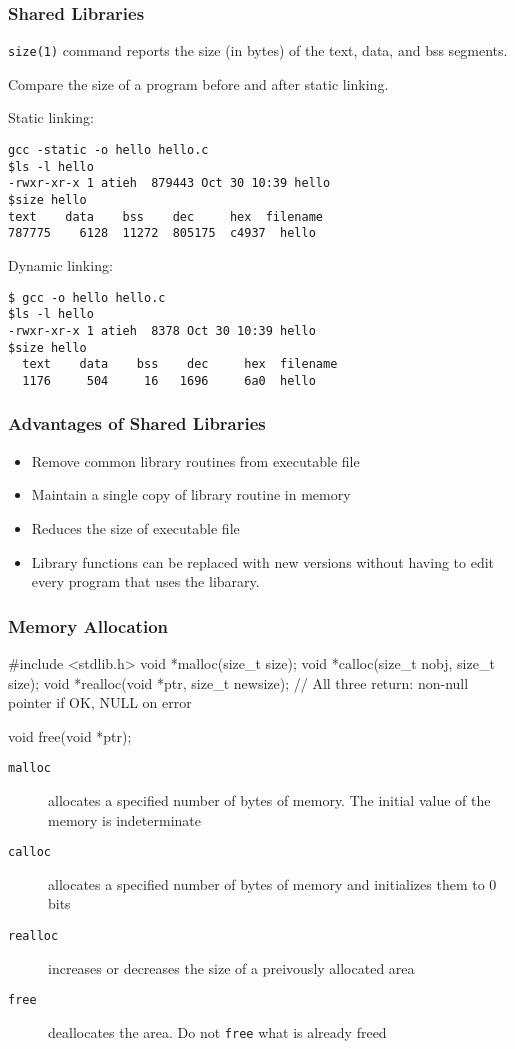 \documentclass[newPxFont,sthlmFooter,nooffset]{beamer}
\begin{document}
\begin{frame}[containsverbatim,t]
  \frametitle{Shared Libraries}
\texttt{size(1)} command reports the size (in bytes) of the text, data, and bss segments.

Compare the size of a program before and after static linking.
\bigskip
{\footnotesize

    Static linking:
\begin{verbatim}
gcc -static -o hello hello.c
$ls -l hello
-rwxr-xr-x 1 atieh  879443 Oct 30 10:39 hello
$size hello
text    data    bss    dec     hex  filename
787775    6128  11272  805175  c4937  hello
\end{verbatim}
    Dynamic linking:
\begin{verbatim}
$ gcc -o hello hello.c
$ls -l hello
-rwxr-xr-x 1 atieh  8378 Oct 30 10:39 hello
$size hello
  text    data    bss    dec     hex  filename
  1176     504     16   1696     6a0  hello
\end{verbatim}

}
\end{frame}

\begin{frame}[containsverbatim,t]
  \frametitle{Advantages of Shared Libraries}
\begin{itemize}
\item Remove common library routines from executable file
\item Maintain a single copy of library routine in memory
\item Reduces the size of executable file
\item Library functions can be replaced with new versions without having to edit every program that uses the libarary.
\end{itemize}
\end{frame}

\begin{frame}[containsverbatim,t]
  \frametitle{Memory Allocation}

\begin{codedef}
#include <stdlib.h>
void *malloc(size_t size);
void *calloc(size_t nobj, size_t size);
void *realloc(void *ptr, size_t newsize);
// All three return: non-null pointer if OK, NULL on error

void free(void *ptr);
\end{codedef}
\begin{description}
\item[\texttt{malloc}] allocates a specified number of bytes of memory. The initial value of the memory is indeterminate
\item[\texttt{calloc}] allocates a specified number of bytes of memory and initializes them to 0 bits
\item[\texttt{realloc}] increases or decreases the size of a preivously allocated area
\item[\texttt{free}] deallocates the area. Do not \texttt{free} what is already freed
\end{description}

\end{frame}
\end{document}
